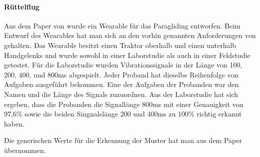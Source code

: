 

\paragraph{R{\"u}ttelflug}

Aus dem Paper von \cite{pescara2016ruttelflug} wurde ein Wearable f{\"u}r das Paragliding entworfen.
Beim Entwurf des Wearables hat man sich an den vorhin genannten Anforderungen von \cite{gemperle2001design} gehalten.
Das Wearable besitzt einen Traktor oberhalb und einen unterhalb Handgelenks und wurde sowohl in einer Laborstudie als auch in einer Feldstudie getestet.
F{\"u}r die Laborstudie wurden Vibrationssignale in der L{\"a}nge von 100, 200, 400, und 800ms abgespielt. 
Jeder Proband hat dieselbe Reihenfolge von Aufgaben ausgef{\"u}hrt bekommen. 
Eine der Aufgaben der Probanden war den Namen und die L{\"a}nge des Signals zuzuordnen. 
Aus der Laborstudie hat sich ergeben, dass die Probanden die Signall{\"a}nge 800ms mit einer Genauigkeit von 97,6\% sowie die beiden Singnalsl{\"a}nge 200 und 400ms zu 100\% richtig erkannt haben. 

Die generischen Werte f{\"u}r die Erkennung der Muster hat man aus dem Paper {\"u}bernommen.